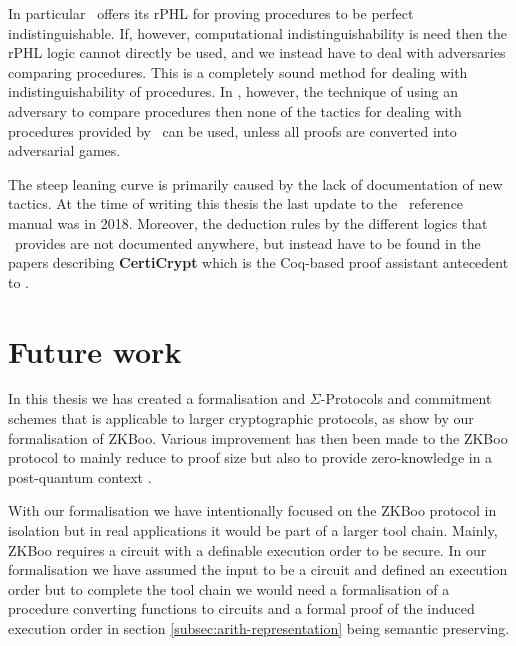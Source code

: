In particular \easycrypt\ offers its rPHL for proving procedures to be perfect
indistinguishable. If, however, computational indistinguishability is need then
the rPHL logic cannot directly be used, and we instead have to deal with
adversaries comparing procedures. This is a completely sound method for dealing
with indistinguishability of procedures. In \easycrypt, however, the technique
of using an adversary to compare procedures then none of the tactics for dealing
with procedures provided by \easycrypt\ can be used, unless all proofs are
converted into adversarial games. 

The steep leaning curve is primarily caused by the lack of documentation of new
tactics. At the time of writing this thesis the last update to the \easycrypt\
reference manual \cite{ec_refman} was in 2018. Moreover, the deduction rules by
the different logics that \easycrypt\ provides are not documented anywhere, but
instead have to be found in the papers describing \textbf{CertiCrypt} which is
the Coq-based proof assistant antecedent to \easycrypt.




\section{Future work}
\label{sec:future_work}
In this thesis we has created a formalisation and $\Sigma$-Protocols and
commitment schemes that is applicable to larger cryptographic protocols, as show
by our formalisation of ZKBoo. Various improvement has then been made to the
ZKBoo protocol to mainly reduce to proof size but also to provide zero-knowledge
in a post-quantum context \cite{zkb++}.

With our formalisation we have intentionally focused on the ZKBoo protocol in
isolation but in real applications it would be part of a larger tool chain.
Mainly, ZKBoo requires a circuit with a definable execution order to be secure.
In our formalisation we have assumed the input to be a circuit and defined an
execution order but to complete the tool chain we would need a formalisation of
a procedure converting functions to circuits and a formal proof of the induced
execution order in section \ref{subsec:arith-representation} being semantic preserving.

